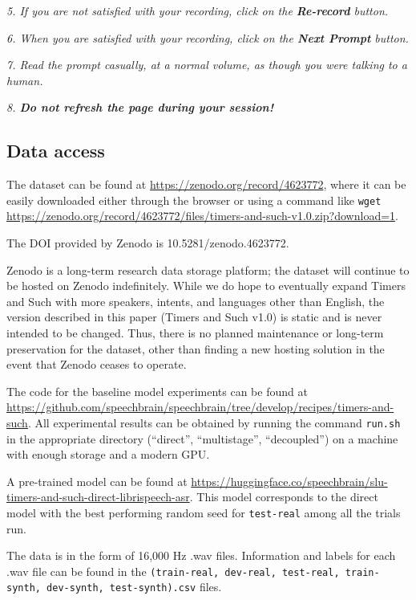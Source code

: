 \documentclass{article}
\begin{document}
\textit{5. If you are not satisfied with your recording, click on the \textbf{Re-record} button.}
    
\textit{6. When you are satisfied with your recording, click on the \textbf{Next Prompt} button.}
    
\textit{7. Read the prompt casually, at a normal volume, as though you were talking to a human.}
    
\textit{8. \textbf{Do not refresh the page during your session!}}

\subsection{Data access}\label{data-access}

The dataset can be found at \url{https://zenodo.org/record/4623772}, where it can be easily downloaded either through the browser or using a command like \texttt{wget} \url{ https://zenodo.org/record/4623772/files/timers-and-such-v1.0.zip?download=1}. 

The DOI provided by Zenodo is 10.5281/zenodo.4623772.

Zenodo is a long-term research data storage platform; the dataset will continue to be hosted on Zenodo indefinitely. While we do hope to eventually expand Timers and Such with more speakers, intents, and languages other than English, the version described in this paper (Timers and Such v1.0) is static and is never intended to be changed. Thus, there is no planned maintenance or long-term preservation for the dataset, other than finding a new hosting solution in the event that Zenodo ceases to operate.

The code for the baseline model experiments can be found at \url{https://github.com/speechbrain/speechbrain/tree/develop/recipes/timers-and-such}. All experimental results can be obtained by running the command \texttt{run.sh} in the appropriate directory (``direct'', ``multistage'', ``decoupled'') on a machine with enough storage and a modern GPU.

A pre-trained model can be found at \url{https://huggingface.co/speechbrain/slu-timers-and-such-direct-librispeech-asr}. This model corresponds to the direct model with the best performing random seed for \texttt{test-real} among all the trials run.

The data is in the form of 16,000 Hz .wav files. Information and labels for each .wav file can be found in the \texttt{(train-real, dev-real, test-real, train-synth, dev-synth, test-synth).csv} files.
\end{document}
